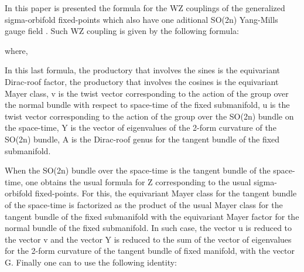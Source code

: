 \documentclass[a4paper,a4paper]{article}
\begin{document}
In this paper is presented the formula for the WZ couplings  of the generalized sigma-orbifold fixed-points which also have one  aditional SO(2n) Yang-Mills gauge field  .  Such WZ coupling is given by the following formula:
\begin{center}
{  \coordHE{} }
\end{center}     
where,
\begin{center}
{  \coordHE{} }
\end{center} 

In this last formula, the productory that involves the sines is the equivariant Dirac-roof factor, the productory that involves the cosines is the equivariant Mayer class, v is the twist vector corresponding to the action of the group \coordHE{} over the normal bundle with respect to space-time of the fixed submanifold, u is the twist vector corresponding to the action of the group \coordHE{} over the SO(2n) bundle on the space-time, Y is the vector of eigenvalues of the 2-form curvature of the SO(2n) bundle, A is the Dirac-roof genus for the tangent bundle of the fixed submanifold.




When the SO(2n) bundle over the space-time is the tangent bundle of the space-time, one obtains the usual formula for Z corresponding to the usual sigma-orbifold fixed-points. For this, the equivariant Mayer class for the tangent bundle of the space-time is factorized as the product of the usual Mayer class for the tangent bundle of the fixed submanifold with the equivariant Mayer factor for the normal bundle of the fixed submanifold. In such case, the vector u is reduced to the vector v and the vector Y is reduced to the sum of the vector of eigenvalues for the 2-form curvature of the tangent bundle of fixed manifold, with the vector G. Finally one can to use the following identity: 

\begin{center}
 
{  \coordHE{}}
\end{center} 
\end{document}
